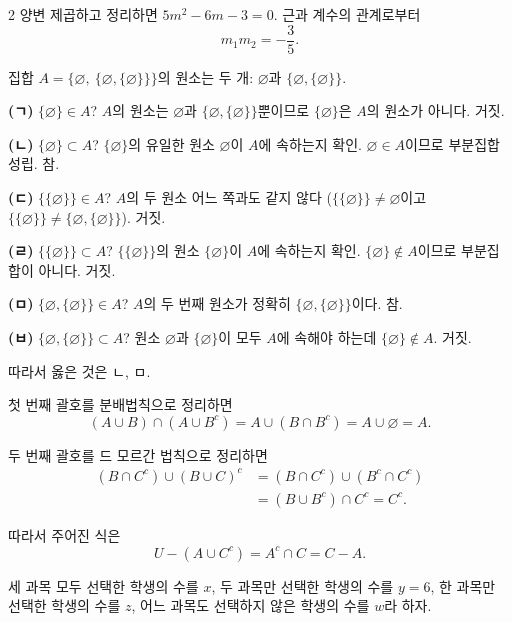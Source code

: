 \documentclass[10pt,fleqn]{article}
\renewcommand{\solpart}[1]{%
  \par\addvspace{10pt}\noindent
  {\sffamily\bfseries\color{black}(#1)}\hspace{3mm}\ignorespaces%
}
\begin{document}
\begin{multicols}{2}
양변 제곱하고 정리하면 $5m^{2} - 6m - 3 = 0$. 근과 계수의 관계로부터
\[ m_{1} m_{2} = -\frac{3}{5}. \]


집합 $A = \{\varnothing,\ \{\varnothing,\{\varnothing\}\}\}$의 원소는 두 개: $\varnothing$과 $\{\varnothing,\{\varnothing\}\}$.

\solpart{ㄱ} $\{\varnothing\} \in A$? $A$의 원소는 $\varnothing$과 $\{\varnothing,\{\varnothing\}\}$뿐이므로 $\{\varnothing\}$은 $A$의 원소가 아니다. 거짓.

\solpart{ㄴ} $\{\varnothing\} \subset A$? $\{\varnothing\}$의 유일한 원소 $\varnothing$이 $A$에 속하는지 확인. $\varnothing \in A$이므로 부분집합 성립. 참.

\solpart{ㄷ} $\{\{\varnothing\}\} \in A$? $A$의 두 원소 어느 쪽과도 같지 않다 ($\{\{\varnothing\}\} \ne \varnothing$이고 $\{\{\varnothing\}\} \ne \{\varnothing,\{\varnothing\}\}$). 거짓.

\solpart{ㄹ} $\{\{\varnothing\}\} \subset A$? $\{\{\varnothing\}\}$의 원소 $\{\varnothing\}$이 $A$에 속하는지 확인. $\{\varnothing\} \notin A$이므로 부분집합이 아니다. 거짓.

\solpart{ㅁ} $\{\varnothing,\{\varnothing\}\} \in A$? $A$의 두 번째 원소가 정확히 $\{\varnothing,\{\varnothing\}\}$이다. 참.

\solpart{ㅂ} $\{\varnothing,\{\varnothing\}\} \subset A$? 원소 $\varnothing$과 $\{\varnothing\}$이 모두 $A$에 속해야 하는데 $\{\varnothing\} \notin A$. 거짓.

따라서 옳은 것은 ㄴ, ㅁ.


첫 번째 괄호를 분배법칙으로 정리하면
\[ (A \cup B) \cap (A \cup B^{c}) = A \cup (B \cap B^{c}) = A \cup \varnothing = A. \]

두 번째 괄호를 드 모르간 법칙으로 정리하면
\begin{align*}
(B \cap C^{c}) \cup (B \cup C)^{c} &= (B \cap C^{c}) \cup (B^{c} \cap C^{c}) \\
&= (B \cup B^{c}) \cap C^{c} = C^{c}.
\end{align*}

따라서 주어진 식은
\[ U - (A \cup C^{c}) = A^{c} \cap C = C - A. \]


세 과목 모두 선택한 학생의 수를 $x$, 두 과목만 선택한 학생의 수를 $y=6$, 한 과목만 선택한 학생의 수를 $z$, 어느 과목도 선택하지 않은 학생의 수를 $w$라 하자.


\end{multicols}
\end{document}
